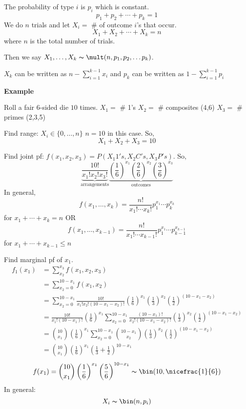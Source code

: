 The probability of type $ i $ is $ p_i $ which is constant.
\[ p_1+p_2+\cdots+p_k=1 \]
We do $ n $ trials and let $ X_i= $ \# of outcome $ i $'s that occur.
\[ X_1+X_2+\cdots+X_k=n \]
where $ n $ is the total number of trials.

Then we say $ X_1,\ldots ,X_k \thicksim \mult(n,p_1,p_2,\ldots p_k) $.
\begin{remark}
    $ X_k $ can be written as $ n-\sum\limits_{i=1}^{k-1}x_i $ and
    $ p_k $ can be written as $ 1-\sum\limits_{i=1}^{k-1} p_i $
\end{remark}

\textbf{Example}

Roll a fair $6$-sided die $ 10 $ times.
$ X_1= $ \# 1's
$ X_2= $ \# composites (4,6)
$ X_3= $ \# primes (2,3,5)

Find range: $ X_i\in \{0,\ldots ,n\} $ $ n=10 $ in this case. So,
\[ X_1+X_2+X_3=10 \]

Find joint pf: $ f({x_1},{x_2},{x_3})=P(X_1 1's, X_2 C's, X_3 P's) $. So,
\[ \underbrace{\frac{10!}{{x_1}!{x_2}!{x_3}!}}_{\text{arrangements}}
\underbrace{\left( \frac{1}{6}  \right)^{x_1} 
\left( \frac{2}{6} \right)^{x_2} \left( \frac{3}{6} \right)^{x_3}}_{\text{outcomes}}\]
In general,
\[ f({x_1},\ldots,x_k)=\frac{n!}{{x_1}!\cdots x_k!}p_1^{{x_1}} \cdots p_k^{x_k}\]
for $ {x_1}+\cdots+x_k=n $
OR
\[ f({x_1},\ldots,x_{k-1})=\frac{n!}{{x_1}!\cdots x_{k-1}!}p_1^{{x_1}} \cdots
p_{k-1}^{x_{k-1}}\]
for $ {x_1}+\cdots+x_{k-1}\le n $

Find marginal pf of $ {x_1} $.
\begin{align*}
    f_1({x_1})&=\sum\limits_{{x_2}}^{{x_3}} f({x_1},{x_2},{x_3})\\
    &=\sum\limits_{{x_2}=0}^{10-{x_1}} f({x_1},{x_2})\\
    &=\sum\limits_{{x_2}=0}^{10-{x_1}} \frac{10!}{{x_1}!{x_2}!(10-{x_1}-{x_2})!}
    \left( \frac{1}{6} \right)^{x_1} 
    \left( \frac{1}{3} \right)^{x_2} \left( \frac{1}{2} \right)^{(10-{x_1}-{x_2})}\\
    &=\frac{10!}{{x_1}!(10-{x_1})!}\left( \frac{1}{6}  \right)^{x_1}
    \sum\limits_{{x_2}=0}^{10-{x_1}} \frac{(10-{x_1})!}{{x_2}!(10-{x_1}-{x_2})!}
    \left( \frac{1}{3} \right)^{x_2} \left( \frac{1}{2} \right)^{(10-{x_1}-{x_2})}\\
    &=\binom{10}{{x_1}}\left( \frac{1}{6}  \right)^{x_1}
    \sum\limits_{{x_2}=0}^{10-{x_1}} \binom{10-{x_1}}{{x_2}}
    \left( \frac{1}{3} \right)^{x_2} \left( \frac{1}{2} \right)^{(10-{x_1}-{x_2})}\\
    &=\binom{10}{{x_1}}\left( \frac{1}{6}  \right)^{x_1}
    \left(\frac{1}{3}+\frac{1}{2} \right)^{10-x_1}
\end{align*}
\[ f(x_1)=\binom{10}{{x_1}}\left( \frac{1}{6}  \right)^{x_1}
\left(\frac{5}{6} \right)^{10-x_1} \thicksim \bin(10,\nicefrac{1}{6} )\]
In general:
\[ X_i \thicksim \bin(n,p_i) \]
